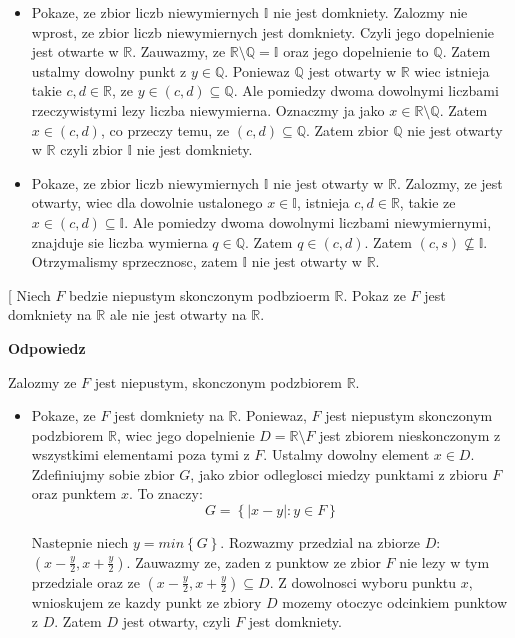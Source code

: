 \documentclass{article}
\makeatletter
\def\myitem{%
   \@ifnextchar[ \@myitem{\@noitemargtrue\@myitem[\@itemlabel]}}
\def\@myitem[#1]{\item[#1]\mbox{}\\}
\makeatother
\begin{document}
\begin{enumerate}[align=left]
\begin{enumerate}[label=(\roman*)]
            \begin{itemize}
                \item Pokaze, ze zbior liczb niewymiernych $\mathbb{I}$ nie jest domkniety. Zalozmy nie wprost, ze zbior liczb niewymiernych jest domkniety. Czyli jego dopelnienie jest otwarte w $\mathbb{R}$. Zauwazmy, ze $\mathbb{R} \setminus \mathbb{Q} = \mathbb{I}$ oraz jego dopelnienie to $\mathbb{Q}$. Zatem ustalmy dowolny punkt z $y \in \mathbb{Q}$. Poniewaz $\mathbb{Q}$ jest otwarty w $\mathbb{R}$ wiec istnieja takie $c, d \in \mathbb{R}$, ze $y \in (c,d) \subseteq \mathbb{Q}$. Ale pomiedzy dwoma dowolnymi liczbami rzeczywistymi lezy liczba niewymierna. Oznaczmy ja jako $x \in \mathbb{R}\setminus \mathbb{Q}$. Zatem $x \in (c,d)$, co przeczy temu, ze $(c,d) \subseteq \mathbb{Q}$. Zatem zbior $\mathbb{Q}$ nie jest otwarty w $\mathbb{R}$ czyli zbior $\mathbb{I}$ nie jest domkniety.
                \item Pokaze, ze zbior liczb niewymiernych $\mathbb{I}$ nie jest otwarty w $\mathbb{R}$. Zalozmy, ze jest otwarty, wiec dla dowolnie ustalonego $x \in \mathbb{I}$, istnieja $c,d \in \mathbb{R}$, takie ze $x \in (c,d) \subseteq \mathbb{I}$. Ale pomiedzy dwoma dowolnymi liczbami niewymiernymi, znajduje sie liczba wymierna $q \in \mathbb{Q}$. Zatem $q \in (c,d)$. Zatem $(c,s) \not\subseteq \mathbb{I}$. Otrzymalismy sprzecznosc, zatem $\mathbb{I}$ nie jest otwarty w $\mathbb{R}$.
            \end{itemize}
        \end{enumerate}
        \myitem Niech $F$ bedzie niepustym skonczonym podbzioerm $\mathbb{R}$. Pokaz ze $F$ jest domkniety na $\mathbb{R}$ ale nie jest otwarty na $\mathbb{R}$.

        \textbf{Odpowiedz}

        Zalozmy ze $F$ jest niepustym, skonczonym podzbiorem $\mathbb{R}$.

        \begin{itemize}
            \item Pokaze, ze $F$ jest domkniety na $\mathbb{R}$. Poniewaz, $F$ jest niepustym skonczonym podzbiorem $\mathbb{R}$, wiec jego dopelnienie $D = \mathbb{R} \setminus F$ jest zbiorem nieskonczonym z wszystkimi elementami poza tymi z $F$. Ustalmy dowolny element $x \in D$. Zdefiniujmy sobie zbior $G$, jako zbior odleglosci miedzy punktami z zbioru $F$ oraz punktem $x$. To znaczy:
                $$ G = \left\{ |x-y| : y \in F \right\}$$

                Nastepnie niech $y = min \left\{ G \right\}$. Rozwazmy przedzial na zbiorze $D$: $(x - \frac{y}{2}, x + \frac{y}{2})$. Zauwazmy ze, zaden z punktow ze zbior $F$ nie lezy w tym przedziale oraz ze $(x - \frac{y}{2}, x + \frac{y}{2}) \subseteq D$. Z dowolnosci wyboru punktu $x$, wnioskujem ze kazdy punkt ze zbiory $D$ mozemy otoczyc odcinkiem punktow z $D$. Zatem $D$ jest otwarty, czyli $F$ jest domkniety. 


\end{itemize}
\end{enumerate}
\end{document}
